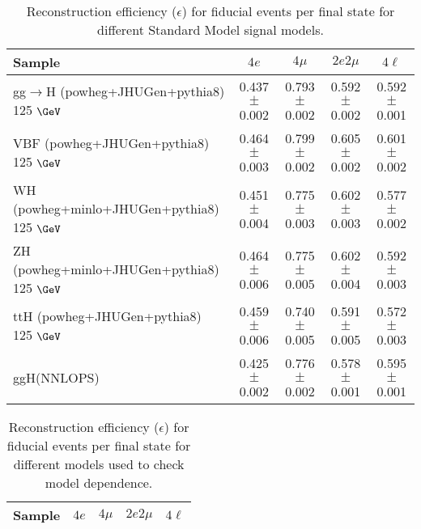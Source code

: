 \documentclass{article}
\begin{document}
\begin{table}[!h!tb]
\begin{center}
\small
\caption{
Reconstruction efficiency ($\epsilon$) for fiducial events per final state for different Standard Model signal models.
\label{tab:efficiencySM}
}
\begin{tabular}{|l|c|c|c|c|} \hline 
Sample & $4e$ & $4\mu$ & $2e2\mu$ & $4\ell$ \\ \hline 
gg$\rightarrow$H ({\sc powheg+JHUGen+pythia8}) 125 $\GeV$ & 0.437 $\pm$ 0.002 & 0.793 $\pm$ 0.002 & 0.592 $\pm$ 0.002 & 0.592 $\pm$ 0.001 \\ 
VBF ({\sc powheg+JHUGen+pythia8}) 125 $\GeV$ & 0.464 $\pm$ 0.003 & 0.799 $\pm$ 0.002 & 0.605 $\pm$ 0.002 & 0.601 $\pm$ 0.002 \\ 
WH ({\sc powheg+minlo+JHUGen+pythia8}) 125 $\GeV$ & 0.451 $\pm$ 0.004 & 0.775 $\pm$ 0.003 & 0.602 $\pm$ 0.003 & 0.577 $\pm$ 0.002 \\ 
ZH ({\sc powheg+minlo+JHUGen+pythia8}) 125 $\GeV$ & 0.464 $\pm$ 0.006 & 0.775 $\pm$ 0.005 & 0.602 $\pm$ 0.004 & 0.592 $\pm$ 0.003 \\ 
ttH ({\sc powheg+JHUGen+pythia8}) 125 $\GeV$ & 0.459 $\pm$ 0.006 & 0.740 $\pm$ 0.005 & 0.591 $\pm$ 0.005 & 0.572 $\pm$ 0.003 \\ 
ggH(NNLOPS) & 0.425 $\pm$ 0.002 & 0.776 $\pm$ 0.002 & 0.578 $\pm$ 0.001 & 0.595 $\pm$ 0.001 \\ 

\hline
\end{tabular}
\normalsize
\end{center}
\end{table}
 
 
 
\begin{table}[!h!tb]
\begin{center}
\small
\caption{
Reconstruction efficiency ($\epsilon$) for fiducial events per final state for different models used to check model dependence.
\label{tab:efficiencyExo}
}
\begin{tabular}{|l|c|c|c|c|} \hline 
Sample & $4e$ & $4\mu$ & $2e2\mu$ & $4\ell$ \\ \hline 

\hline
\end{tabular}
\normalsize
\end{center}
\end{table}
 
 
 
\end{document}
